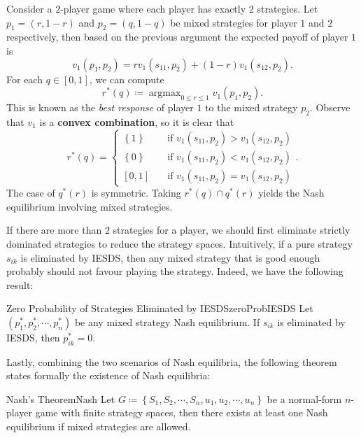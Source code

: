 \documentclass[math]{amznotes}
\theoremstyle{remark}
\DeclareMathOperator*{\argmax}{argmax}
\begin{document}
Consider a $2$-player game where each player has exactly $2$ strategies. Let $p_1 = \left(r, 1 - r\right)$ and $p_2 = \left(q, 1 - q\right)$ be mixed strategies for player $1$ and $2$ respectively, then based on the previous argument the expected payoff of player $1$ is 
\begin{equation*}
    v_1\left(p_1, p_2\right) = rv_1\left(s_{11}, p_2\right) + \left(1 - r\right)v_1\left(s_{12}, p_2\right).
\end{equation*}
For each $q \in \left[0, 1\right]$, we can compute 
\begin{equation*}
    r^*\left(q\right) \coloneqq \argmax_{0 \leq r \leq 1}v_1\left(p_1, p_2\right).
\end{equation*}
This is known as the \textit{best response} of player $1$ to the mixed strategy $p_2$. Observe that $v_1$ is a \textbf{convex combination}, so it is clear that 
\begin{equation*}
    r^*\left(q\right) = \begin{cases}
        \left\{1\right\} & \quad\textrm{if } v_1\left(s_{11}, p_2\right) > v_1\left(s_{12}, p_2\right) \\
        \left\{0\right\} & \quad\textrm{if } v_1\left(s_{11}, p_2\right) < v_1\left(s_{12}, p_2\right) \\
        \left[0, 1\right] & \quad\textrm{if } v_1\left(s_{11}, p_2\right) = v_1\left(s_{12}, p_2\right)
    \end{cases}.
\end{equation*}
The case of $q^*\left(r\right)$ is symmetric. Taking $r^*\left(q\right) \cap q^*\left(r\right)$ yields the Nash equilibrium involving mixed strategies.

If there are more than $2$ strategies for a player, we should first eliminate strictly dominated strategies to reduce the strategy spaces. Intuitively, if a pure strategy $s_{ik}$ is eliminated by IESDS, then any mixed strategy that is good enough probably should not favour playing the strategy. Indeed, we have the following result:
\begin{probox}{Zero Probability of Strategies Eliminated by IESDS}{zeroProbIESDS}
    Let $\left(p_1^*, p_2^*, \cdots, p_n^*\right)$ be any mixed strategy Nash equilibrium. If $s_{ik}$ is eliminated by IESDS, then $p_{ik}^* = 0$.
\end{probox}
Lastly, combining the two scenarios of Nash equilibria, the following theorem states formally the existence of Nash equilibria:
\begin{thmbox}{Nash's Theorem}{Nash}
    Let $G \coloneqq \left\{S_1, S_2, \cdots, S_n, u_1, u_2, \cdots, u_n\right\}$ be a normal-form $n$-player game with finite strategy spaces, then there exists at least one Nash equilibrium if mixed strategies are allowed.
\end{thmbox}
\end{document}
